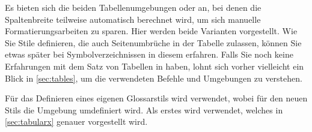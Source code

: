 \documentclass[%
  english,ngerman,%
  geometry=no,DIV=12,automark,%
]{tudscrartcl}
\begin{document}
Es bieten sich die beiden Tabellenumgebungen  oder 
 an, bei denen die Spaltenbreite teilweise automatisch 
berechnet wird, um sich manuelle Formatierungsarbeiten zu sparen. Hier werden 
beide Varianten vorgestellt. Wie Sie Stile definieren, die auch Seitenumbrüche 
in der Tabelle zulassen, können Sie etwas später bei Symbolverzeichnissen in 
diesem  erfahren. Falls Sie noch keine Erfahrungen 
mit dem Satz von Tabellen in  haben, lohnt sich vorher vielleicht 
ein Blick in \autoref{sec:tables}, um die verwendeten Befehle und Umgebungen zu 
verstehen.

Für das Definieren eines eigenen Glossarstils wird  
verwendet, wobei für den neuen Stils die Umgebung  
umdefiniert wird. Als erstes wird  verwendet, welches in 
\autoref{sec:tabularx} genauer vorgestellt wird.
\end{document}
